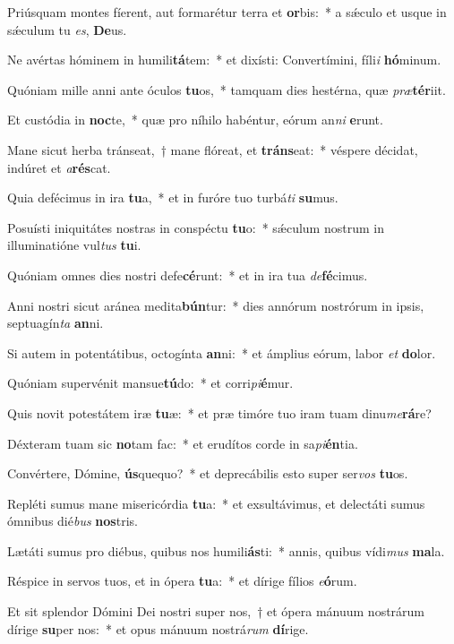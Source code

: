 \item Priúsquam montes fíerent, aut formarétur terra et \textbf{or}bis:~* a sǽculo et usque in sǽculum tu \textit{es}, \textbf{De}us.
\item Ne avértas hóminem in humili\textbf{tá}tem:~* et dixísti: Convertímini, fíli\textit{i} \textbf{hó}minum.
\item Quóniam mille anni ante óculos \textbf{tu}os,~* tamquam dies hestérna, quæ \textit{præ}\textbf{tér}iit.
\item Et custódia in \textbf{noc}te,~* quæ pro níhilo habéntur, eórum an\textit{ni} \textbf{e}runt.
\item Mane sicut herba tránseat,~† mane flóreat, et \textbf{tráns}eat:~* véspere décidat, indúret et \textit{a}\textbf{rés}cat.
\item Quia defécimus in ira \textbf{tu}a,~* et in furóre tuo turbá\textit{ti} \textbf{su}mus.
\item Posuísti iniquitátes nostras in conspéctu \textbf{tu}o:~* sǽculum nostrum in illuminatióne vul\textit{tus} \textbf{tu}i.
\item Quóniam omnes dies nostri defe\textbf{cé}runt:~* et in ira tua \textit{de}\textbf{fé}cimus.
\item Anni nostri sicut aránea medita\textbf{bún}tur:~* dies annórum nostrórum in ipsis, septuagín\textit{ta} \textbf{an}ni.
\item Si autem in potentátibus, octogínta \textbf{an}ni:~* et ámplius eórum, labor \textit{et} \textbf{do}lor.
\item Quóniam supervénit mansue\textbf{tú}do:~* et corri\textit{pi}\textbf{é}mur.
\item Quis novit potestátem iræ \textbf{tu}æ:~* et præ timóre tuo iram tuam dinu\textit{me}\textbf{rá}re?
\item Déxteram tuam sic \textbf{no}tam fac:~* et erudítos corde in sa\textit{pi}\textbf{én}tia.
\item Convértere, Dómine, \textbf{ús}quequo?~* et deprecábilis esto super ser\textit{vos} \textbf{tu}os.
\item Repléti sumus mane misericórdia \textbf{tu}a:~* et exsultávimus, et delectáti sumus ómnibus dié\textit{bus} \textbf{nos}tris.
\item Lætáti sumus pro diébus, quibus nos humili\textbf{ás}ti:~* annis, quibus vídi\textit{mus} \textbf{ma}la.
\item Réspice in servos tuos, et in ópera \textbf{tu}a:~* et dírige fílios \textit{e}\textbf{ó}rum.
\item Et sit splendor Dómini Dei nostri super nos,~† et ópera mánuum nostrárum dírige \textbf{su}per nos:~* et opus mánuum nostrá\textit{rum} \textbf{dí}rige.
